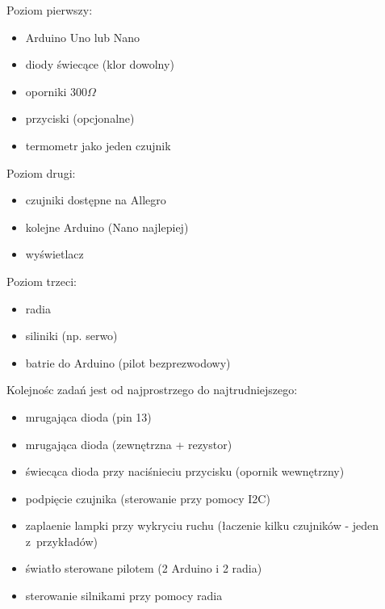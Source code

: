 Poziom pierwszy:
\begin{itemize}
\item Arduino Uno lub Nano
\item diody świecące (klor dowolny)
\item oporniki $300\Omega$
\item przyciski (opcjonalne)
\item termometr jako jeden czujnik
 \end{itemize}

Poziom drugi:
\begin{itemize}
\item czujniki dostępne na Allegro
\item kolejne Arduino (Nano najlepiej)
\item wyświetlacz
 \end{itemize}

Poziom trzeci:
\begin{itemize}
\item radia
\item siliniki (np. serwo)
\item batrie do Arduino (pilot bezprezwodowy)
\end{itemize}
        
Kolejnośc zadań jest od najprostrzego do najtrudniejszego:
 \begin{itemize}
\item mrugająca dioda (pin 13)
\item mrugająca dioda (zewnętrzna + rezystor)
\item świecąca dioda przy naciśnieciu przycisku (opornik wewnętrzny)
\item podpięcie czujnika (sterowanie przy pomocy I2C)
\item zaplaenie lampki przy wykryciu ruchu (łaczenie kilku czujników - jeden z~przykładów)
\item światło sterowane pilotem (2 Arduino i 2 radia)
\item sterowanie silnikami przy pomocy radia
 \end{itemize}
